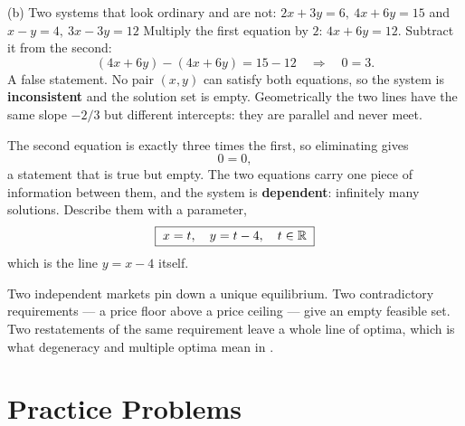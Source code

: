 \begin{worked}{(b) Two systems that look ordinary and are not: $2x+3y=6,\ 4x+6y=15$ and $x-y=4,\ 3x-3y=12$}
Multiply the first equation by $2$: $4x+6y=12$. Subtract it from the second:
\[
  (4x+6y)-(4x+6y)=15-12
  \quad\Longrightarrow\quad
  0=3 .
\]
A false statement. No pair $(x,y)$ can satisfy both equations, so the system
is \textbf{inconsistent} and the solution set is empty. Geometrically the two
lines have the same slope $-2/3$ but different intercepts: they are parallel
and never meet.

The second equation is exactly three times the first, so eliminating gives
\[
  0=0 ,
\]
a statement that is true but empty. The two equations carry one piece of
information between them, and the system is \textbf{dependent}: infinitely
many solutions. Describe them with a parameter,
\[
  \boxed{\;x=t,\quad y=t-4,\quad t\in\mathbb{R}\;}
\]
which is the line $y=x-4$ itself.

Two independent markets pin down a unique equilibrium. Two contradictory
requirements --- a price floor above a price ceiling --- give an empty
feasible set. Two restatements of the same requirement leave a whole line of
optima, which is what degeneracy and multiple optima mean in .
\end{worked}

\section{Practice Problems}

